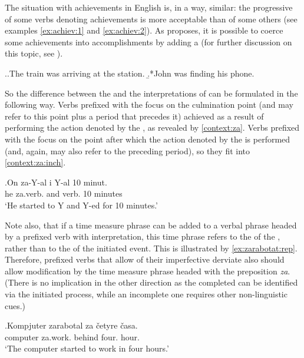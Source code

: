 The situation with achievements in English is, in a way, similar: the progressive of some verbs denoting achievements is more acceptable than of some others (see examples \ref{ex:achiev:1} and \ref{ex:achiev:2}). As \citet{Rothstein:04} proposes, it is possible to coerce some achievements into accomplishments by adding a  (for further discussion on this topic, see \citealt{Gyarmathy:15}).

\ex.\a.\label{ex:achiev:1}The train was arriving at the station.
\b.*John was finding his phone.\label{ex:achiev:2}

So the difference between the  and the  interpretations of  can be formulated in the following way. Verbs prefixed with the   focus on the culmination point (and may refer to this point plus a period that precedes it) achieved as a result of performing the action denoted by the , as revealed by  \ref{context:za}. Verbs prefixed with the   focus on the point after which the action denoted by the  is performed (and, again, may also refer to the preceding period), so they fit into  \ref{context:za:inch}.

\exg.\label{context:za:inch}On za-Y-al i Y-al 10 minut.\\
he za.verb. and verb. 10 minutes\\
\trans `He started to Y and Y-ed for 10 minutes.'

Note also, that if a time measure phrase can be added to a verbal phrase headed by a prefixed verb with  interpretation, this time phrase refers to the  of the , rather than to the  of the initiated event. This is illustrated by \ref{ex:zarabotat:rep}. Therefore,  prefixed verbs that allow  of their imperfective derviate also should allow modification by the time measure phrase headed with the preposition \textit{za}. (There is no implication in the other direction as the completed  can be identified via the initiated process, while an incomplete one requires other non-linguistic cues.)

\exg.\label{ex:zarabotat:rep}Kompjuter zarabotal za \v{c}etyre \v{c}asa.\\
computer za.work. behind four. hour.\\
\trans `The computer started to work in four hours.'

